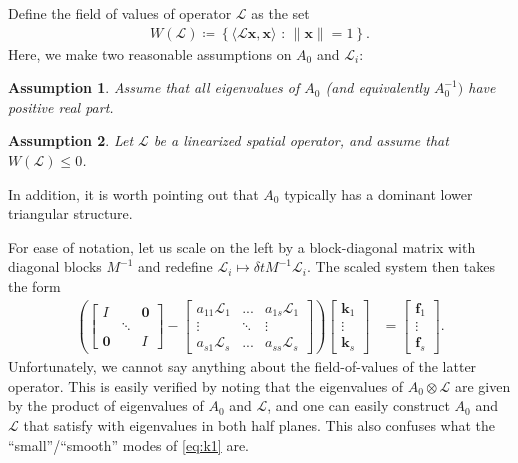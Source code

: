 \documentclass[a4paper,10pt]{article}
\newtheorem{assumption}{Assumption}
\begin{document}
Define the field of values of operator $\mathcal{L}$ as the set
%
\begin{align}\label{eq:fov}
W(\mathcal{L}) \coloneqq \left\{ \langle \mathcal{L}\mathbf{x},\mathbf{x}\rangle \text{ : }
	\|\mathbf{x}\| = 1 \right\}.
\end{align}
Here, we make two reasonable assumptions on $A_0$ and $\mathcal{L}_i$:
%
\begin{assumption}\label{ass:eig}
Assume that all eigenvalues of $A_0$ (and equivalently $A_0^{-1})$ have positive real part.
\end{assumption}
\begin{assumption}\label{ass:fov}
Let $\mathcal{L}$ be a linearized spatial operator, and assume that $W(\mathcal{L}) \leq 0$.
\end{assumption}
%
\noindent
In addition, it is worth pointing out that $A_0$ typically has a dominant
lower triangular structure.

For ease of notation, let us scale on the left by a block-diagonal matrix
with diagonal blocks $M^{-1}$ and redefine $\mathcal{L}_i \mapsto
\delta tM^{-1}\mathcal{L}_i$. The scaled system then takes the form
%
\begin{align}\label{eq:k1}
\left( \begin{bmatrix} I & & \mathbf{0} \\ & \ddots \\ \mathbf{0} & & I\end{bmatrix}
	- \begin{bmatrix} a_{11}\mathcal{L}_1 & ... & a_{1s}\mathcal{L}_1 \\
	\vdots & \ddots & \vdots \\ a_{s1}\mathcal{L}_s & ... & a_{ss} \mathcal{L}_s \end{bmatrix} \right)
	\begin{bmatrix} \mathbf{k}_1 \\ \vdots \\ \mathbf{k}_s \end{bmatrix} 
& = \begin{bmatrix} \mathbf{f}_1 \\ \vdots \\ \mathbf{f}_s \end{bmatrix}.
\end{align}
%
Unfortunately, we cannot say anything about the field-of-values of the latter operator.
This is easily verified by noting that the eigenvalues of $A_0\otimes \mathcal{L}$
are given by the product of eigenvalues of $A_0$ and $\mathcal{L}$, and one can easily
construct $A_0$ and $\mathcal{L}$ that satisfy  with eigenvalues
in both half planes. This also confuses what the ``small''/``smooth'' modes of
\eqref{eq:k1} are. 
\end{document}

